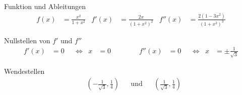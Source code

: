 \begin{taskframes}{3.107}
\begin{taskframe}
    \begin{mathbox}{Funktion und Ableitungen}
        \begin{align*}
            f(x) &= \frac{x^2}{1+x^2} & f'(x) &= \frac{2x}{(1+x^2)^2} & f''(x) &= \frac{2(1-3x^2)}{(1+x^2)^3}
        \end{align*}
    \end{mathbox}

    \begin{mathbox}{Nullstellen von $f'$ und $f''$}
        \begin{align*}
            f'(x) &= 0 & &\Leftrightarrow & x &= 0 & && &&
            f''(x) &= 0 & &\Leftrightarrow & x &= \pm\frac{1}{\sqrt{3}}
        \end{align*}
    \end{mathbox}
    \begin{mathbox}{Wendestellen}
        \begin{align*}
            &(-\frac{1}{\sqrt{3}}, \frac{1}{4}) & &\text{und} & &(\frac{1}{\sqrt{3}}, \frac{1}{4})
        \end{align*}
    \end{mathbox}
\end{taskframe}

\end{taskframes}

